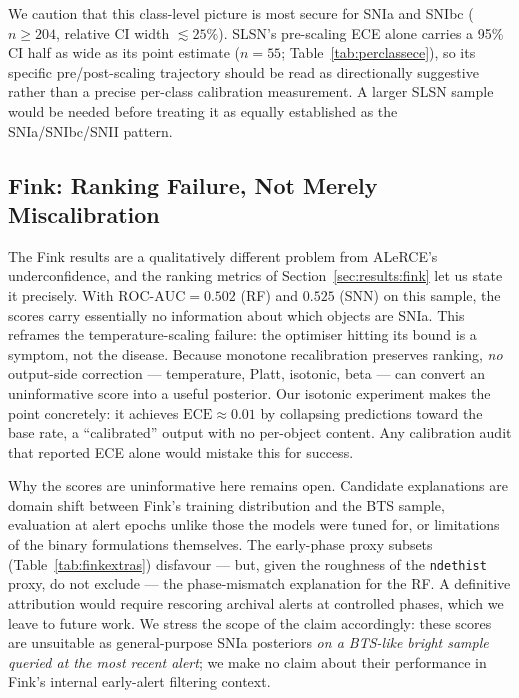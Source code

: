 We caution that this class-level picture is most secure for
SNIa and SNIbc ($n \geq 204$, relative CI width $\lesssim 25\%$).
SLSN's pre-scaling ECE alone carries a 95\% CI half as wide as
its point estimate ($n = 55$; Table~\ref{tab:perclassece}), so its
specific pre/post-scaling trajectory should be read as directionally
suggestive rather than a precise per-class calibration measurement.
A larger SLSN sample would be needed before treating it as equally
established as the SNIa/SNIbc/SNII pattern.

\subsection{Fink: Ranking Failure, Not Merely Miscalibration}
\label{sec:discussion:fink}

The Fink results are a qualitatively different problem from
ALeRCE's underconfidence, and the ranking metrics of
Section~\ref{sec:results:fink} let us state it precisely. With
$\mathrm{ROC\mbox{-}AUC} = 0.502$ (RF) and $0.525$ (SNN) on this
sample, the scores carry essentially no information about which
objects are SNIa. This reframes the temperature-scaling failure: the
optimiser hitting its bound is a symptom, not the disease. Because
monotone recalibration preserves ranking, \emph{no} output-side
correction — temperature, Platt, isotonic, beta — can convert an
uninformative score into a useful posterior. Our isotonic experiment
makes the point concretely: it achieves $\mathrm{ECE} \approx 0.01$
by collapsing predictions toward the base rate, a ``calibrated''
output with no per-object content. Any calibration audit that
reported ECE alone would mistake this for success.

Why the scores are uninformative here remains open. Candidate
explanations are domain shift between Fink's training distribution
and the BTS sample, evaluation at alert epochs unlike those the
models were tuned for, or limitations of the binary formulations
themselves. The early-phase proxy subsets
(Table~\ref{tab:finkextras}) disfavour — but, given the roughness of
the \texttt{ndethist} proxy, do not exclude — the phase-mismatch
explanation for the RF. A definitive attribution would require
rescoring archival alerts at controlled phases, which we leave to
future work. We stress the scope of the claim accordingly: these
scores are unsuitable as general-purpose SNIa posteriors \emph{on a
BTS-like bright sample queried at the most recent alert}; we make no
claim about their performance in Fink's internal early-alert
filtering context.

